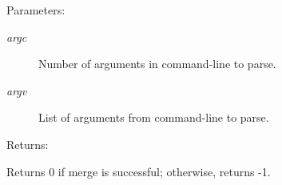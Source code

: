 \begin{Desc}
\item[Parameters: ]\par
\begin{description}
\item[{\em 
argc}]Number of arguments in command-line to parse. \item[{\em 
argv}]List of arguments from command-line to parse. \end{description}
\end{Desc}
\begin{Desc}
\item[Returns: ]\par
Returns 0 if merge is successful; otherwise, returns -1. \end{Desc}
